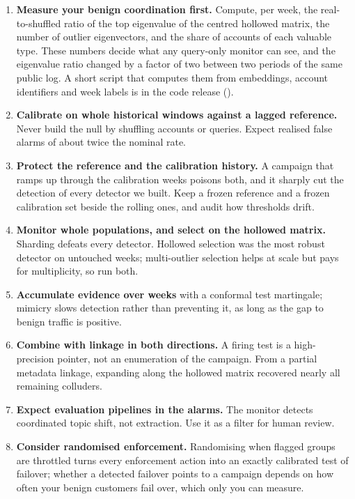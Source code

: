 \begin{enumerate}[leftmargin=1.5em]
\item \textbf{Measure your benign coordination first.} Compute, per week, the real-to-shuffled ratio of the top eigenvalue of the centred hollowed matrix, the number of outlier eigenvectors, and the share of accounts of each valuable type. These numbers decide what any query-only monitor can see, and the eigenvalue ratio changed by a factor of two between two periods of the same public log. A short script that computes them from embeddings, account identifiers and week labels is in the code release (\coderepo).
\item \textbf{Calibrate on whole historical windows against a lagged reference.} Never build the null by shuffling accounts or queries. Expect realised false alarms of about twice the nominal rate.
\item \textbf{Protect the reference and the calibration history.} A campaign that ramps up through the calibration weeks poisons both, and it sharply cut the detection of every detector we built. Keep a frozen reference and a frozen calibration set beside the rolling ones, and audit how thresholds drift.
\item \textbf{Monitor whole populations, and select on the hollowed matrix.} Sharding defeats every detector. Hollowed selection was the most robust detector on untouched weeks; multi-outlier selection helps at scale but pays for multiplicity, so run both.
\item \textbf{Accumulate evidence over weeks} with a conformal test martingale; mimicry slows detection rather than preventing it, as long as the gap to benign traffic is positive.
\item \textbf{Combine with linkage in both directions.} A firing test is a high-precision pointer, not an enumeration of the campaign. From a partial metadata linkage, expanding along the hollowed matrix recovered nearly all remaining colluders.
\item \textbf{Expect evaluation pipelines in the alarms.} The monitor detects coordinated topic shift, not extraction. Use it as a filter for human review.
\item \textbf{Consider randomised enforcement.} Randomising when flagged groups are throttled turns every enforcement action into an exactly calibrated test of failover; whether a detected failover points to a campaign depends on how often your benign customers fail over, which only you can measure.
\end{enumerate}
